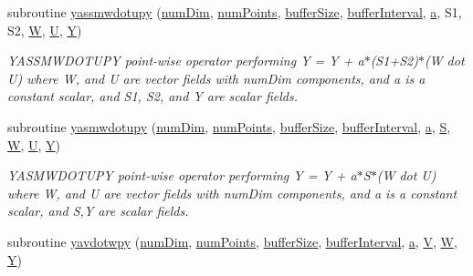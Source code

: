 \begin{DoxyCompactItemize}
subroutine \hyperlink{namespacesimple_a09474af35d990198966e2950a33ba9d5}{yassmwdotupy} (\hyperlink{SATKernels_8H_a680185db8546de161968dabace9e94f1}{num\+Dim}, \hyperlink{ViscidKernels_8H_adf0bf75d0875d1bb42a5348bee7b7bfd}{num\+Points}, \hyperlink{SpecialKernels_8H_aa9426cdf16e85054db35e88f9b68c6be}{buffer\+Size}, \hyperlink{WENOKernels_8H_ad1001168d5432b52e6d0636f4dc0e60c}{buffer\+Interval}, \hyperlink{SimpleKernels_8H_a80f0b648bfd720a2277538fbad1d1eca}{a}, S1, S2, \hyperlink{SimpleKernels_8H_a47539bc7159e013320007f51fcbf1fe3}{W}, \hyperlink{SimpleKernels_8H_aca4ab6143606c908fb1a7de286ddddae}{U}, \hyperlink{SimpleKernels_8H_a4731ec58a5102a3b2d3116eaff33f108}{Y})
\begin{DoxyCompactList}\small\item\em Y\+A\+S\+S\+M\+W\+D\+O\+T\+U\+PY point-\/wise operator performing Y = Y + a$\ast$(S1+\+S2)$\ast$(W dot U) where W, and U are vector fields with num\+Dim components, and a is a constant scalar, and S1, S2, and Y are scalar fields. \end{DoxyCompactList}\item 
subroutine \hyperlink{namespacesimple_a8f61bdc8c6ab35cdd9d71616200fd9f4}{yasmwdotupy} (\hyperlink{SATKernels_8H_a680185db8546de161968dabace9e94f1}{num\+Dim}, \hyperlink{ViscidKernels_8H_adf0bf75d0875d1bb42a5348bee7b7bfd}{num\+Points}, \hyperlink{SpecialKernels_8H_aa9426cdf16e85054db35e88f9b68c6be}{buffer\+Size}, \hyperlink{WENOKernels_8H_ad1001168d5432b52e6d0636f4dc0e60c}{buffer\+Interval}, \hyperlink{SimpleKernels_8H_a80f0b648bfd720a2277538fbad1d1eca}{a}, \hyperlink{SimpleKernels_8H_a1851b05129a14a393984de733889e64b}{S}, \hyperlink{SimpleKernels_8H_a47539bc7159e013320007f51fcbf1fe3}{W}, \hyperlink{SimpleKernels_8H_aca4ab6143606c908fb1a7de286ddddae}{U}, \hyperlink{SimpleKernels_8H_a4731ec58a5102a3b2d3116eaff33f108}{Y})
\begin{DoxyCompactList}\small\item\em Y\+A\+S\+M\+W\+D\+O\+T\+U\+PY point-\/wise operator performing Y = Y + a$\ast$\+S$\ast$(W dot U) where W, and U are vector fields with num\+Dim components, and a is a constant scalar, and S,Y are scalar fields. \end{DoxyCompactList}\item 
subroutine \hyperlink{namespacesimple_ae052725aabe2937b940c96be18e975d9}{yavdotwpy} (\hyperlink{SATKernels_8H_a680185db8546de161968dabace9e94f1}{num\+Dim}, \hyperlink{ViscidKernels_8H_adf0bf75d0875d1bb42a5348bee7b7bfd}{num\+Points}, \hyperlink{SpecialKernels_8H_aa9426cdf16e85054db35e88f9b68c6be}{buffer\+Size}, \hyperlink{WENOKernels_8H_ad1001168d5432b52e6d0636f4dc0e60c}{buffer\+Interval}, \hyperlink{SimpleKernels_8H_a80f0b648bfd720a2277538fbad1d1eca}{a}, \hyperlink{SpecialKernels_8H_ac6b3e75b07df9bb98a9911c89819ba5a}{V}, \hyperlink{SimpleKernels_8H_a47539bc7159e013320007f51fcbf1fe3}{W}, \hyperlink{SimpleKernels_8H_a4731ec58a5102a3b2d3116eaff33f108}{Y})

\end{DoxyCompactItemize}

